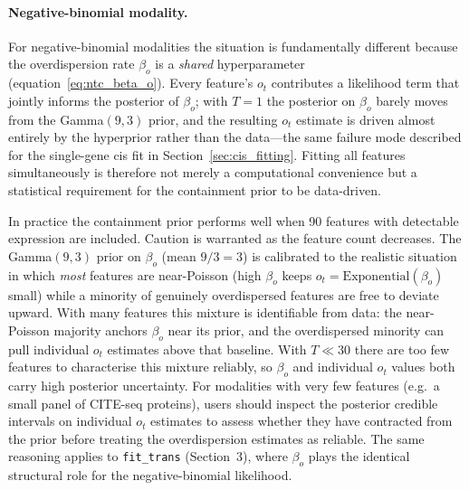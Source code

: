 \documentclass[12pt]{article}
\begin{document}
\paragraph{Negative-binomial modality.}
For negative-binomial modalities the situation is fundamentally different because the
overdispersion rate $\beta_o$ is a \emph{shared} hyperparameter
(equation~\ref{eq:ntc_beta_o}).
Every feature's $o_t$ contributes a likelihood term that jointly informs the posterior of
$\beta_o$; with $T = 1$ the posterior on $\beta_o$ barely moves from the Gamma$(9,3)$
prior, and the resulting $o_t$ estimate is driven almost entirely by the hyperprior rather
than the data—the same failure mode described for the single-gene cis fit in
Section~\ref{sec:cis_fitting}.
Fitting all features simultaneously is therefore not merely a computational convenience
but a statistical requirement for the containment prior to be data-driven.

In practice the containment prior performs well when 90 features with
detectable expression are included.
Caution is warranted as the feature count decreases.
The Gamma$(9,3)$ prior on $\beta_o$ (mean $9/3 = 3$) is calibrated to the realistic
situation in which \emph{most} features are near-Poisson (high $\beta_o$ keeps
$o_t = \mathrm{Exponential}(\beta_o)$ small) while a minority of genuinely overdispersed
features are free to deviate upward.
With many features this mixture is identifiable from data: the near-Poisson majority
anchors $\beta_o$ near its prior, and the overdispersed minority can pull individual
$o_t$ estimates above that baseline.
With $T \ll 30$ there are too few features to characterise this mixture reliably, so
$\beta_o$ and individual $o_t$ values both carry high posterior uncertainty.
For modalities with very few features (e.g.\ a small panel of CITE-seq proteins), users
should inspect the posterior credible intervals on individual $o_t$ estimates to assess
whether they have contracted from the prior before treating the overdispersion estimates as reliable.
The same reasoning applies to \texttt{fit\_trans} (Section~3), where $\beta_o$ plays the
identical structural role for the negative-binomial likelihood.
\end{document}
